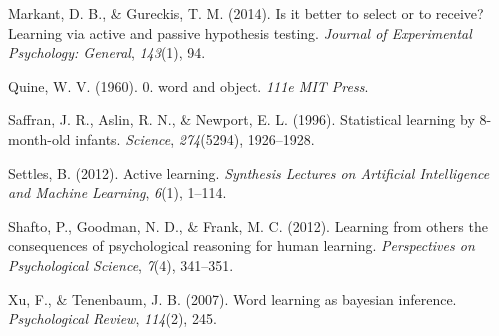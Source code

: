 \documentclass[a4paper,man,apacite,floatsintext]{apa6}
\begin{document}
\hypertarget{ref-markant2014better}{}
Markant, D. B., \& Gureckis, T. M. (2014). Is it better to select or to
receive? Learning via active and passive hypothesis testing.
\emph{Journal of Experimental Psychology: General}, \emph{143}(1), 94.

\hypertarget{ref-quine19600}{}
Quine, W. V. (1960). 0. word and object. \emph{111e MIT Press}.

\hypertarget{ref-saffran1996statistical}{}
Saffran, J. R., Aslin, R. N., \& Newport, E. L. (1996). Statistical
learning by 8-month-old infants. \emph{Science}, \emph{274}(5294),
1926--1928.

\hypertarget{ref-settles2012active}{}
Settles, B. (2012). Active learning. \emph{Synthesis Lectures on
Artificial Intelligence and Machine Learning}, \emph{6}(1), 1--114.

\hypertarget{ref-shafto2012learning}{}
Shafto, P., Goodman, N. D., \& Frank, M. C. (2012). Learning from others
the consequences of psychological reasoning for human learning.
\emph{Perspectives on Psychological Science}, \emph{7}(4), 341--351.

\hypertarget{ref-xu2007word}{}
Xu, F., \& Tenenbaum, J. B. (2007). Word learning as bayesian inference.
\emph{Psychological Review}, \emph{114}(2), 245.


\end{document}
